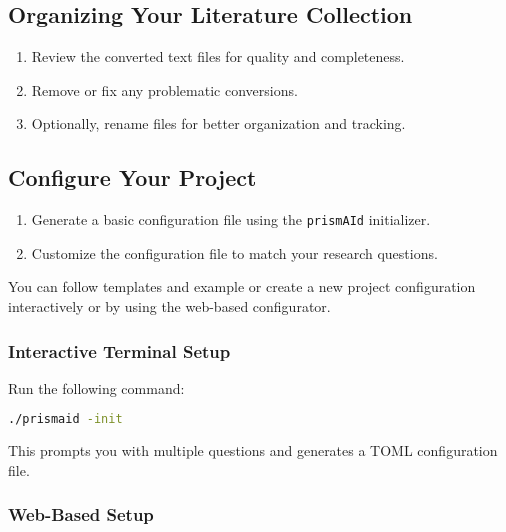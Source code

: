 \subsection{Organizing Your Literature Collection}

\begin{enumerate}
    \item Review the converted text files for quality and completeness.
    \item Remove or fix any problematic conversions.
    \item Optionally, rename files for better organization and tracking.
\end{enumerate}


\subsection{Configure Your Project}

\begin{enumerate}
    \item Generate a basic configuration file using the \texttt{prismAId} initializer.
    \item Customize the configuration file to match your research questions.
\end{enumerate}

You can follow templates and example or create a new project configuration interactively or by using the web-based configurator.

\subsubsection{Interactive Terminal Setup}

\begin{commandbox}
Run the following command:
\begin{lstlisting}[language=Bash]
./prismaid -init
\end{lstlisting}
\end{commandbox}

This prompts you with multiple questions and generates a TOML configuration file.

\subsubsection{Web-Based Setup}

